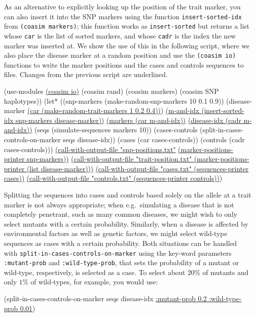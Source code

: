 \documentclass{manual}
\begin{document}
As an alternative to explicitly looking up the position of the trait
marker, you can also insert it into the SNP markers using the function
\texttt{insert-sorted-idx} from \texttt{(coasim markers)}; this
function works as \texttt{insert-sorted} but returns a list whose
\texttt{car} is the list of sorted markers, and whose \texttt{cadr} is
the index the new marker was inserted at.  We show the use of this in
the following script, where we also place the disease marker at a
random position and use the \texttt{(coasim io)} functions to write
the marker positions and the cases and controls sequences to files.
Changes from the previous script are underlined.
\begin{code}
(use-modules \underline{(coasim io)} (coasim rand)
             (coasim markers) (coasim SNP haplotypes))
(let* ((snp-markers    (make-random-snp-markers   10 0.1 0.9))
       (disease-marker \underline{(car (make-random-trait-markers 1 0.2 0.4))})
       \underline{(m-and-idx (insert-sorted-idx snp-markers disease-marker))}
       \underline{(markers (car m-and-idx))}
       \underline{(disease-idx (cadr m-and-idx))}
       (seqs (simulate-sequences markers 10))
       (cases-controls (split-in-cases-controls-on-marker seqs disease-idx))
       (cases (car cases-controls))
       (controls (cadr cases-controls)))
  \underline{(call-with-output-file "snp-positions.txt"}
  \underline{  (marker-positions-printer snp-markers))}
  \underline{(call-with-output-file "trait-position.txt" }
  \underline{  (marker-positions-printer (list disease-marker)))}
  \underline{(call-with-output-file "cases.txt"    (sequences-printer cases))}
  \underline{(call-with-output-file "controls.txt" (sequences-printer controls))})
\end{code}

Splitting the sequences into cases and controls based solely on the
allele at a trait marker is not always appropriate; when e.g.\ 
simulating a disease that is not completely penetrant, such as many
common diseases, we might wish to only select mutants with a certain
probability.  Similarly, when a disease is affected by environmental
factors as well as genetic factors, we might select wild-type
sequences as cases with a certain probability.  Both situations can be
handled with \texttt{split-in-cases-controls-on-marker} using the key-word
parameters \texttt{:mutant-prob} and \texttt{:wild-type-prob}, that
sets the probability of a mutant or wild-type, respectively, is
selected as a case.  To select about $20\%$ of mutants and only
$1\%$ of wild-types, for example, you would use:
\begin{code}
(split-in-cases-controls-on-marker seqs disease-idx
                                   \underline{:mutant-prob 0.2 :wild-type-prob 0.01})
\end{code}
\end{document}
